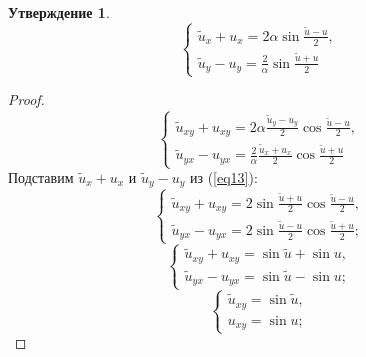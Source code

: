 \documentclass[12pt]{article}
\newtheorem{utv}{Утверждение}
\theoremstyle{definition}
\begin{document}
\begin{itemize}
\begin{utv}
\begin{equation}
        \left\{
        \begin{array}{l}
            \tilde u_x+u_x=2\alpha\sin\frac{\tilde u-u}{2},\\
            \tilde u_y-u_y=\frac{2}{\alpha}\sin\frac{\tilde u+u}{2}
        \end{array}\right.
        \end{equation}
    \end{utv}   
    \begin{proof}
        \begin{equation}
            \left\{
        \begin{array}{l}
            \tilde u_{xy}+u_{xy}=2\alpha\frac{\tilde u_y-u_y}{2}\cos\frac{\tilde u-u}{2},\\
            \tilde u_{yx}-u_{yx}=\frac{2}{\alpha}\frac{\tilde u_x+u_x}{2}\cos\frac{\tilde u+u}{2}
        \end{array}\right.
        \end{equation}
        Подставим $\tilde u_x+u_x$ и $\tilde u_y-u_y$ из (\ref{eq13}):
        \begin{equation}
            \left\{
        \begin{array}{l}
            \tilde u_{xy}+u_{xy}=2\sin\frac{\tilde u+u}{2}\cos\frac{\tilde u-u}{2},\\
            \tilde u_{yx}-u_{yx}=2\sin\frac{\tilde u-u}{2}\cos\frac{\tilde u+u}{2};
        \end{array}\right.
        \end{equation}
        \begin{equation}
            \left\{
        \begin{array}{l}
            \tilde u_{xy}+u_{xy}=\sin\tilde u+\sin u,\\
            \tilde u_{yx}-u_{yx}=\sin\tilde u-\sin u;
        \end{array}\right.
        \end{equation}
        \begin{equation}
            \boxed{\left\{
        \begin{array}{l}
            \tilde u_{xy}=\sin\tilde u,\\
            u_{xy}=\sin u;
        \end{array}\right.}
        \end{equation}
    \end{proof}
\end{itemize}
\end{document}
